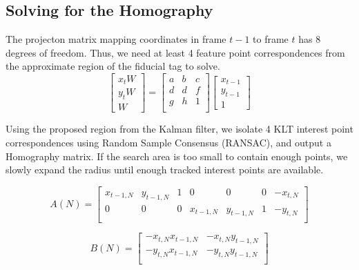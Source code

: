 \documentclass[letterpaper,10pt,conference]{IEEEtran}
\begin{document}
\subsection{Solving for the Homography}
The projecton matrix mapping coordinates in frame $t-1$ to frame $t$ has 8 degrees of freedom. Thus, we need at least 4 feature point correspondences from the approximate region of the fiducial tag to solve. 
\begin{equation}
\begin{bmatrix}
x_{t}W\\
y_{t}W\\
W
\end{bmatrix}
= \begin{bmatrix}
a&b&c\\
d&d&f\\
g&h&1\\
\end{bmatrix}
\begin{bmatrix}
x_{t-1}\\
y_{t-1}\\
1
\end{bmatrix}
\end{equation}

Using the proposed region from the Kalman filter, we isolate 4 KLT interest point correspondences using Random Sample Consensus (RANSAC), and output a Homography matrix. If the search area is too small to contain enough points, we slowly expand the radius until enough tracked interest points are available.

\begin{equation}
A(N) = 
\begin{bmatrix}
x_{t-1,N}& y_{t-1,N}&1&0&0&0& -x_{t,N}\\
0&0&0&x_{t-1,N}& y_{t-1,N}&1& -y_{t,N}\\
\end{bmatrix}
\end{equation}

\begin{equation}
B(N) = 
\begin{bmatrix}
-x_{t,N}x_{t-1,N}& -x_{t,N}y_{t-1,N}\\
-y_{t,N}x_{t-1,N} &-y_{t,N}y_{t-1,N}\\
\end{bmatrix}
\end{equation}
\end{document}
